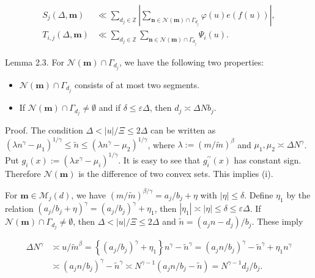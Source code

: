 \documentclass[10pt]{article}
\begin{document}
\begin{align*}
S_{j}(\Delta, \mathbf{m}) & \ll \sum_{d_{j} \in \mathbb{Z}}\left|\sum_{\mathbf{n} \in \mathscr{N}(\mathbf{m}) \cap \Gamma_{d_{j}}} \varphi(u) e(f(u))\right|,  \tag{2.4}\\
T_{i,j}(\Delta,\mathbf m)&\ll\sum_{d_j\in\mathbb Z}\sum_{\mathbf n\in\mathscr N(\mathbf m)\cap\Gamma_{d_j}}\Psi_i(u).\tag{2.4$'$}
\end{align*}


Lemma 2.3. For $\mathscr{N}(\mathbf{m}) \cap \Gamma_{d_{j}}$, we have the following two properties:

\begin{itemize}
  \item[(i)] $\mathscr{N}(\mathbf{m}) \cap \Gamma_{d_j}$ consists of at most two segments.
  \item[(ii)] If $\mathscr{N}(\mathbf{m}) \cap \Gamma_{d_{j}} \neq \emptyset$ and if $\delta \leqslant \varepsilon \Delta$, then $d_{j} \asymp \Delta N b_{j}$.
\end{itemize}

Proof. The condition $\Delta<|u| / \Xi \leqslant 2 \Delta$ can be written as $\left(\lambda n^{\gamma}-\mu_{1}\right)^{1 / \gamma} \leqslant \tilde{n} \leqslant \left(\lambda n^{\gamma}-\mu_{2}\right)^{1 / \gamma}$, where $\lambda:=(m / \tilde{m})^{\beta}$ and $\mu_{1}, \mu_{2} \asymp \Delta N^{\gamma}$. Put $g_{i}(x):=\left(\lambda x^{\gamma}-\mu_{i}\right)^{1 / \gamma}$. It is easy to see that $g_{i}^{\prime \prime}(x)$ has constant sign. Therefore $\mathscr{N}(\mathbf{m})$ is the difference of two convex sets. This implies (i).

For $\mathbf{m} \in \mathscr{M}_{j}(d)$, we have $(m / \tilde{m})^{\beta / \gamma}=a_{j} / b_{j}+\eta$ with $|\eta| \leqslant \delta$. Define $\eta_{1}$ by the relation $\left(a_{j} / b_{j}+\eta\right)^{\gamma}=\left(a_{j} / b_{j}\right)^{\gamma}+\eta_{1}$, then $\left|\eta_{1}\right| \asymp|\eta| \leqslant \delta \leqslant \varepsilon \Delta$. If $\mathscr{N}(\mathbf{m}) \cap \Gamma_{d_{j}} \neq \emptyset$, then $\Delta<|u| / \Xi \leqslant 2 \Delta$ and $\tilde{n}=\left(a_{j} n-d_{j}\right) / b_{j}$. These imply

$$
\begin{aligned}
\Delta N^{\gamma} & \asymp u / \tilde{m}^{\beta}=\left\{\left(a_{j} / b_{j}\right)^{\gamma}+\eta_{1}\right\} n^{\gamma}-\tilde{n}^{\gamma}=\left(a_{j} n / b_{j}\right)^{\gamma}-\tilde{n}^{\gamma}+\eta_{1} n^{\gamma} \\
& \asymp\left(a_{j} n / b_{j}\right)^{\gamma}-\tilde{n}^{\gamma} \asymp N^{\gamma-1}\left(a_{j} n / b_{j}-\tilde{n}\right)=N^{\gamma-1} d_{j} / b_{j} .
\end{aligned}
$$
\end{document}
